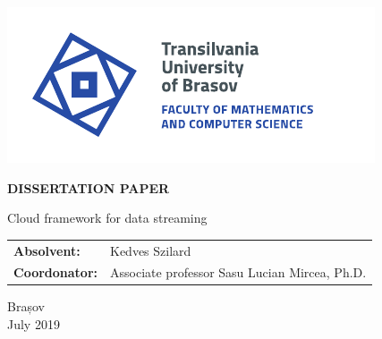\begin{titlepage}
	
	\vspace*{-3cm}
	\hspace{-2cm}
	\includegraphics[width=0.8\linewidth]{./images/Logo-UT-MI-SPOT-EN} %
	
	\begin{center}
		\Huge
		
		\vspace{2cm}
		
		\textbf{DISSERTATION PAPER}
		
		\vspace{1cm}
		
		\LARGE
		Cloud framework for data streaming
		
		\vfill
		
		\Large
		\begin{tabular}{ll}
			\textbf{Absolvent:}&Kedves Szilard\\
			\textbf{Coordonator:}&Associate professor Sasu Lucian Mircea, Ph.D.
		\end{tabular}
		
		\vfill
		
		\Large
		Brașov\\
		July 2019
		
	\end{center}
\end{titlepage}